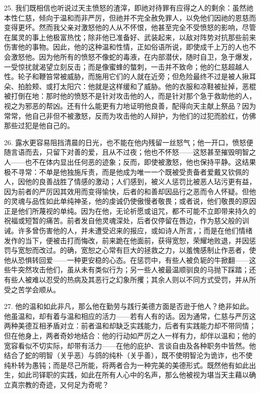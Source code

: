 25. 我们既相信也听说过天主愤怒的渣滓，即祂对待罪有应得之人的剩余：虽然祂本性仁慈，倾向于温和而非严厉，但祂并不完全赦免罪人，以免他们因祂的恩慈而变得更坏。然而我父亲对激怒他的人从不怀恨，他甚至完全不受愤怒的影响，尽管在属灵的事上他极富热忱；除非他已准备好、武装起来，以敌对阵势对抗那些前来伤害他的事物。因此，他的这种温和性情，正如俗语所说，即使成千上万的人也不会激怒他。因为他所有的愤怒不像蛇的毒液，在内部潜伏，随时自卫，急于爆发，一受惊扰就渴望立刻反击；而是像蜜蜂的螫刺，一击并不致命；他的仁慈超越人性。轮子和鞭笞常被威胁，而施用它们的人就在近旁；但危险最终不过是被人揪耳朵、拍脸颊、或打太阳穴：他就是这样缓和了威胁。他的衣服和凉鞋被扯掉，恶棍被打倒在地：那时他的愤怒不是针对攻击他的人，而是针对那个急于救助他的人，视之为邪恶的帮凶。还有什么能更有力地证明他良善，配得向天主献上祭品？因为常常，他自己非但不被激怒，反而为攻击他的人辩护，为他们的过犯而脸红，仿佛那些过犯是他自己的。\par

26. 露水更容易阻挡清晨的日光，也不能在他内残留一丝怒气；他一开口，愤怒便随言语而去，只留下对善的爱，且从不过夜；他也不怀怒——这怒甚至摧毁明智之人——也不在体内显出任何恶的迹象；反而，即使被激怒，他也保持平静。这结果极不寻常：不单是他独施斥责，而是他成为唯一一个既被受责备者爱戴又钦佩的人，因他的良善战胜了情感的激动；人们感到，被义人惩罚比被恶人玷污更有益，因为前者的严厉因其效用而变得愉快，后者的和善却因品行之恶而令人怀疑。但他的灵魂与品性如此单纯神圣，他的虔诚仍使傲慢者敬畏；或者说，他们敬畏的原因正是他们所蔑视的单纯。因为在他，无论祈愿或诅咒，都不可能不立即带来持久的祝福或短暂的痛苦。前者发自他灵魂深处，后者仅停留在唇边，作为慈父般的训诫。许多曾伤害他的人，并未遭受迟来的报应，或如诗人所言，；而是在他们情绪发作的当下，便被击打而悔改，前来跪在他面前，获得宽恕，荣耀地败退，并因惩罚与宽恕而改过。的确，宽恕之心常有巨大的拯救之力，以羞愧感制止作恶者，使他从恐惧转回爱——一种更安稳的心态。在惩罚中，有些人被负轭的牛掀翻——这些牛突然攻击他们，虽从未有类似行为；另一些人被最温顺驯良的马抛下踩踏；还有些人被难以忍受的热病及其恶行之幻象所攫；其余人则以不同方式受罚，并从所受之苦学会顺从。\par

27. 他的温和如此非凡，那么他在勤劳与践行美德方面是否逊于他人？绝非如此。他虽温和，却有着与温和相应的活力——若有人有的话。因为通常，仁慈与严厉这两种美德互相矛盾对立：前者温和却缺乏实践能力，后者有实践能力却不带同情；但在他身上，两者奇妙地结合：他的行动如严厉之人一样有力，却伴以温和；他的宽容看似不切实际，却带有活力——在他的庇护、言谈自由及各种职务中皆然。他结合了蛇的明智（关乎恶）与鸽的纯朴（关乎善），既不使明智沦为诡诈，也不使纯朴转为愚钝；而是尽己所能，将两者合为一种完美的美德形式。既然他有如此出生，如此司铎职的实践，如此在所有人心中的名声，那么他被视为堪当天主藉以确立真宗教的奇迹，又何足为奇呢？\par

